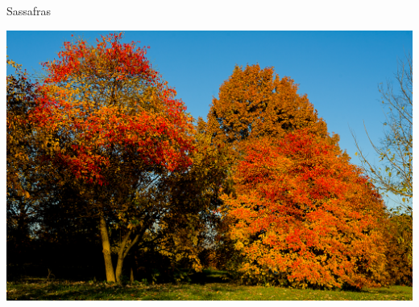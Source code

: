 \documentclass{beamer}
\begin{document}
\begin{frame}{Sassafras}

\includegraphics[width=\textwidth]{../images/Sassafras-albidum.jpg}

\end{frame}
\end{document}
